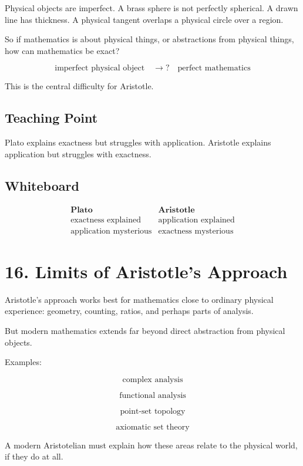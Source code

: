 \documentclass[11pt]{article}
\begin{document}
Physical objects are imperfect. A brass sphere is not perfectly spherical. A drawn line has
thickness. A physical tangent overlaps a physical circle over a region.

So if mathematics is about physical things, or abstractions from physical things, how can
mathematics be exact?

\[
\text{imperfect physical object}
\quad \longrightarrow ? \quad
\text{perfect mathematics}
\]

This is the central difficulty for Aristotle.

\subsection*{Teaching Point}

Plato explains exactness but struggles with application. Aristotle explains application but
struggles with exactness.

\subsection*{Whiteboard}

\[
\begin{array}{c|c}
\textbf{Plato} & \textbf{Aristotle} \\
\hline
\text{exactness explained} & \text{application explained} \\
\text{application mysterious} & \text{exactness mysterious}
\end{array}
\]

\section*{16. Limits of Aristotle's Approach}

Aristotle's approach works best for mathematics close to ordinary physical experience:
geometry, counting, ratios, and perhaps parts of analysis.

But modern mathematics extends far beyond direct abstraction from physical objects.

Examples:

\[
\text{complex analysis}
\]

\[
\text{functional analysis}
\]

\[
\text{point-set topology}
\]

\[
\text{axiomatic set theory}
\]

A modern Aristotelian must explain how these areas relate to the physical world, if they
do at all.
\end{document}
